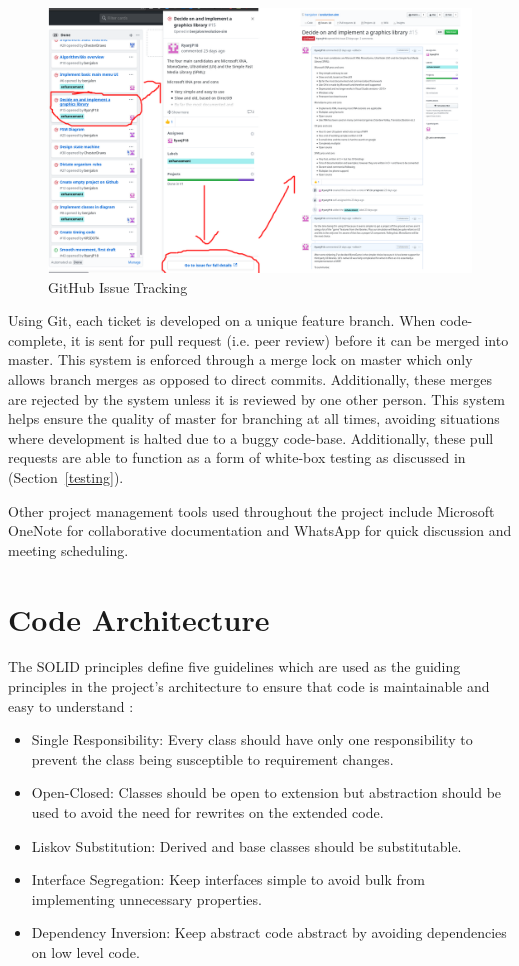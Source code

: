 \documentclass[a4paper, oneside, 11pt]{report}
\begin{document}
\begin{figure}[H]
	\caption{GitHub Issue Tracking}\label{gitissue}
	\centering
	\includegraphics[width=1\textwidth]{gitissuetrack}
\end{figure}

Using Git, each ticket is developed on a unique feature branch. When code-complete, it is sent for pull request (i.e. peer review) before it can be merged into master. This system is enforced through a merge lock on master which only allows branch merges as opposed to direct commits. Additionally, these merges are rejected by the system unless it is reviewed by one other person. This system helps ensure the quality of master for branching at all times, avoiding situations where development is halted due to a buggy code-base. Additionally, these pull requests are able to function as a form of white-box testing as discussed in (Section~\ref{testing}).

Other project management tools used throughout the project include Microsoft OneNote for collaborative documentation and WhatsApp for quick discussion and meeting scheduling.

\section{Code Architecture}\label{architecture}
The SOLID principles define five guidelines which are used as the guiding principles in the project's architecture to ensure that code is maintainable and easy to understand \cite{kelmendi}:
\begin{itemize}
	\item Single Responsibility: Every class should have only one responsibility to prevent the class being susceptible to requirement changes.
	\item Open-Closed: Classes should be open to extension but abstraction should be used to avoid the need for rewrites on the extended code.
	\item Liskov Substitution: Derived and base classes should be substitutable.
	\item Interface Segregation: Keep interfaces simple to avoid bulk from implementing unnecessary properties.
	\item Dependency Inversion: Keep abstract code abstract by avoiding dependencies on low level code.
\end{itemize}
\end{document}
